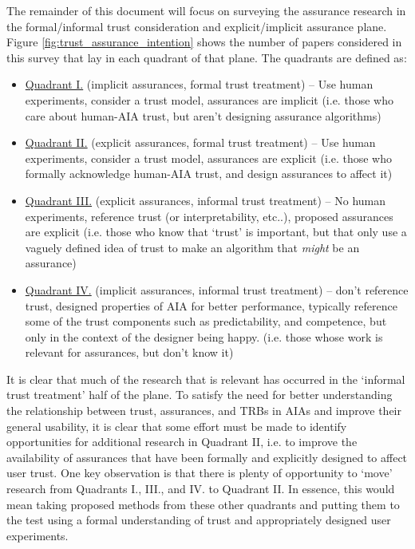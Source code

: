 The remainder of this document will focus on surveying the assurance research in the formal/informal trust consideration and explicit/implicit assurance plane. Figure \ref{fig:trust_assurance_intention} shows the number of papers considered in this survey that lay in each quadrant of that plane. The quadrants are defined as:

\begin{itemize}
    \item \hyperref[sec:q1]{Quadrant I.} (implicit assurances, formal trust treatment) -- Use human experiments, consider a trust model, assurances are implicit (i.e. those who care about human-AIA trust, but aren't designing assurance algorithms)
    \item \hyperref[sec:q2]{Quadrant II.} (explicit assurances, formal trust treatment) -- Use human experiments, consider a trust model, assurances are explicit (i.e. those who formally acknowledge human-AIA trust, and design assurances to affect it)
    \item \hyperref[sec:q3]{Quadrant III.} (explicit assurances, informal trust treatment) -- No human experiments, reference trust (or interpretability, etc..), proposed assurances are explicit (i.e. those who know that `trust' is important, but that only use a vaguely defined idea of trust to make an algorithm that \emph{might} be an assurance)
    \item \hyperref[sec:q4]{Quadrant IV.} (implicit assurances, informal trust treatment) -- don't reference trust, designed properties of AIA for better performance, typically reference some of the trust components such as predictability, and competence, but only in the context of the designer being happy. (i.e. those whose work is relevant for assurances, but don't know it)
\end{itemize}

It is clear that much of the research that is relevant has occurred in the `informal trust treatment' half of the plane. To satisfy the need for better understanding the relationship between trust, assurances, and TRBs in AIAs and improve their general usability, it is clear that some effort must be made to identify opportunities for additional research in Quadrant II, i.e. to improve the availability of assurances that have been formally and explicitly designed to affect user trust. One key observation is that there is plenty of opportunity to `move' research from Quadrants I., III., and IV. to Quadrant II. In essence, this would mean taking proposed methods from these other quadrants and putting them to the test using a formal understanding of trust and appropriately designed user experiments.





